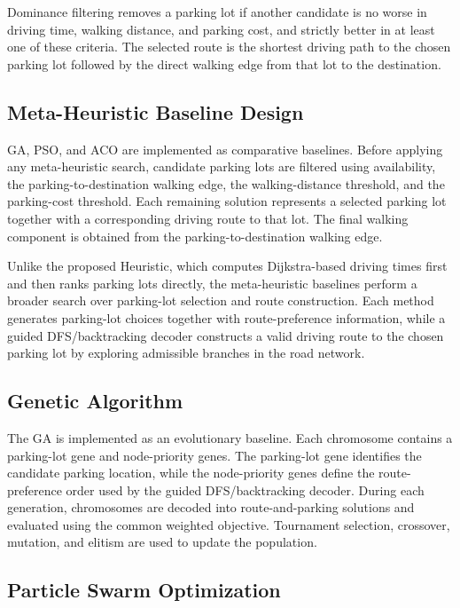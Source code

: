 Dominance filtering removes a parking lot if another candidate is no worse in driving time, walking distance, and parking cost, and strictly better in at least one of these criteria. The selected route is the shortest driving path to the chosen parking lot followed by the direct walking edge from that lot to the destination.

\subsection{Meta-Heuristic Baseline Design}

GA, PSO, and ACO are implemented as comparative baselines. Before applying any meta-heuristic search, candidate parking lots are filtered using availability, the parking-to-destination walking edge, the walking-distance threshold, and the parking-cost threshold. Each remaining solution represents a selected parking lot together with a corresponding driving route to that lot. The final walking component is obtained from the parking-to-destination walking edge.

Unlike the proposed Heuristic, which computes Dijkstra-based driving times first and then ranks parking lots directly, the meta-heuristic baselines perform a broader search over parking-lot selection and route construction. Each method generates parking-lot choices together with route-preference information, while a guided DFS/backtracking decoder constructs a valid driving route to the chosen parking lot by exploring admissible branches in the road network.

\subsection{Genetic Algorithm}

The GA is implemented as an evolutionary baseline. Each chromosome contains a parking-lot gene and node-priority genes. The parking-lot gene identifies the candidate parking location, while the node-priority genes define the route-preference order used by the guided DFS/backtracking decoder. During each generation, chromosomes are decoded into route-and-parking solutions and evaluated using the common weighted objective. Tournament selection, crossover, mutation, and elitism are used to update the population.

\subsection{Particle Swarm Optimization}

